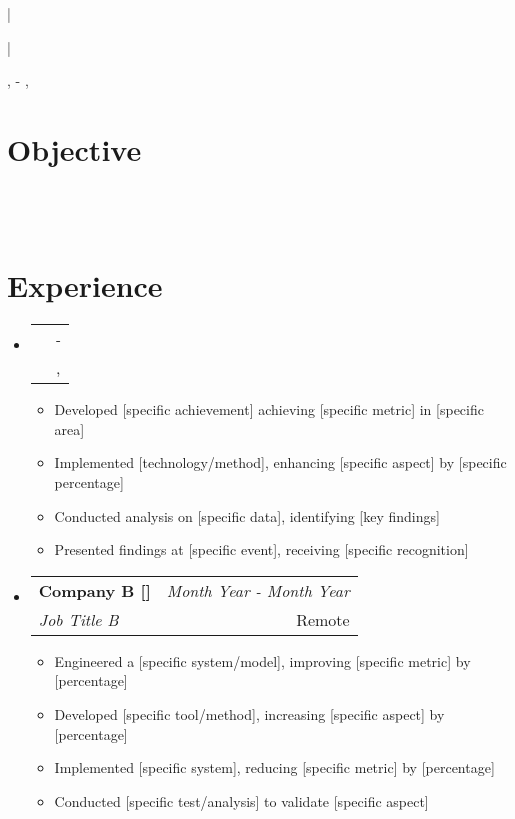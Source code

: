 \documentclass[a4paper,11pt]{article}
\makeatletter
\newcommand{\resumeSubheading}[4]{
\vspace{0.5mm}\item
\begin{tabular*}{0.98\textwidth}[t]{l@{\extracolsep{\fill}}r}
\textbf{#1} & \textit{\footnotesize{#4}} \\
\textit{\footnotesize{#3}} &  \footnotesize{#2}\\
\end{tabular*}
\vspace{-2.4mm}
}
\newcommand{\resumeSubHeadingListStart}{\begin{itemize}[leftmargin=*,labelsep=1mm]}
\newcommand{\resumeItemListStart}{\begin{itemize}[leftmargin=*,labelsep=1mm,itemsep=0.5mm]}
\newcommand{\resumeSubHeadingListEnd}{\end{itemize}\vspace{2mm}}
\newcommand{\resumeItemListEnd}{\end{itemize}\vspace{-2mm}}
\newcommand{\socialicon}[1]{\raisebox{-0.05em}{\resizebox{!}{1em}{#1}}}
\newcommand{\headerfontiii}{\fontfamily{ppl}\selectfont} %
\makeatother
\begin{document}
\headerfontiii

\begin{center}
{\Huge\textbf{\fullname}}
\end{center}
\vspace{-6mm}

\begin{center}
\small{
\phone | \email
}
\end{center}
\vspace{-6mm}

\begin{center}
\small{
\socialicon{\faLinkedin} \href{\linkedin}{\linkedin} |
\socialicon{\faGithub} \href{\github}{\github}
}
\end{center}
\vspace{-6mm}
\begin{center}
\small{\city, \state - \zipcode, \country}
\end{center}

\vspace{-4mm}

\section{\textbf{Objective}}
\vspace{1mm}
\small
{} {}\\{} {}\\
\vspace{-2mm}



\section{\textbf{Experience}}
\vspace{-0.4mm}
\resumeSubHeadingListStart
\resumeSubheading
{{\companyA}}{\companyACity, \companyAState}
{\jobTitleA}{\companyAStart - \companyAEnd}
\resumeItemListStart
\item Developed [specific achievement] achieving [specific metric] in [specific area]
\item Implemented [technology/method], enhancing [specific aspect] by [specific percentage]
\item Conducted analysis on [specific data], identifying [key findings]
\item Presented findings at [specific event], receiving [specific recognition]
\resumeItemListEnd
\resumeSubheading
{Company B [\href{https://www.companyb.com}{\faIcon{globe}}]}{Remote}
{Job Title B}{Month Year - Month Year}
\resumeItemListStart
\item Engineered a [specific system/model], improving [specific metric] by [percentage]
\item Developed [specific tool/method], increasing [specific aspect] by [percentage]
\item Implemented [specific system], reducing [specific metric] by [percentage]
\item Conducted [specific test/analysis] to validate [specific aspect]
\resumeItemListEnd
\resumeSubHeadingListEnd
\vspace{-6mm}
\end{document}
